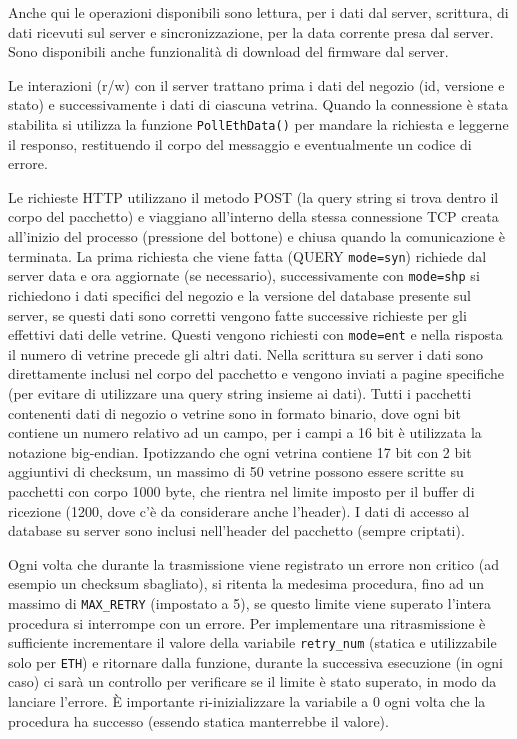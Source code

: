 
Anche qui le operazioni disponibili sono lettura, per i dati dal server, scrittura, di dati ricevuti sul server e sincronizzazione, per la data corrente presa dal server. Sono disponibili anche funzionalit\`a di download del firmware dal server.

Le interazioni (r/w) con il server trattano prima i dati del negozio (id, versione e stato) e successivamente i dati di ciascuna vetrina. Quando la connessione \`e stata stabilita si utilizza la funzione \texttt{PollEthData()} per mandare la richiesta e leggerne il responso, restituendo il corpo del messaggio e eventualmente un codice di errore.

Le richieste HTTP utilizzano il metodo POST (la query string si trova dentro il corpo del pacchetto) e viaggiano all'interno della stessa connessione TCP creata all'inizio del processo (pressione del bottone) e chiusa quando la comunicazione \`e terminata. La prima richiesta che viene fatta (QUERY \texttt{mode=syn}) richiede dal server data e ora aggiornate (se necessario), successivamente con \texttt{mode=shp} si richiedono i dati specifici del negozio e la versione del database presente sul server, se questi dati sono corretti vengono fatte successive richieste per gli effettivi dati delle vetrine. Questi vengono richiesti con \texttt{mode=ent} e nella risposta il numero di vetrine precede gli altri dati. Nella scrittura su server i dati sono direttamente inclusi nel corpo del pacchetto e vengono inviati a pagine specifiche (per evitare di utilizzare una query string insieme ai dati). Tutti i pacchetti contenenti dati di negozio o vetrine sono in formato binario, dove ogni bit contiene un numero relativo ad un campo, per i campi a 16 bit \`e utilizzata la notazione big-endian.
Ipotizzando che ogni vetrina contiene 17 bit con 2 bit aggiuntivi di checksum, un massimo di 50 vetrine possono essere scritte su pacchetti con corpo 1000 byte, che rientra nel limite imposto per il buffer di ricezione (1200, dove c'\`e da considerare anche l'header). I dati di accesso al database su server sono inclusi nell'header del pacchetto (sempre criptati).

Ogni volta che durante la trasmissione viene registrato un errore non critico (ad esempio un checksum sbagliato), si ritenta la medesima procedura, fino ad un massimo di \texttt{MAX\_RETRY} (impostato a 5), se questo limite viene superato l'intera procedura si interrompe con un errore. Per implementare una ritrasmissione \`e sufficiente incrementare il valore della variabile \texttt{retry\_num} (statica e utilizzabile solo per \texttt{ETH}) e ritornare dalla funzione, durante la successiva esecuzione (in ogni caso) ci sar\`a un controllo per verificare se il limite \`e stato superato, in modo da lanciare l'errore. \`E importante ri-inizializzare la variabile a 0 ogni volta che la procedura ha successo (essendo statica manterrebbe il valore).

